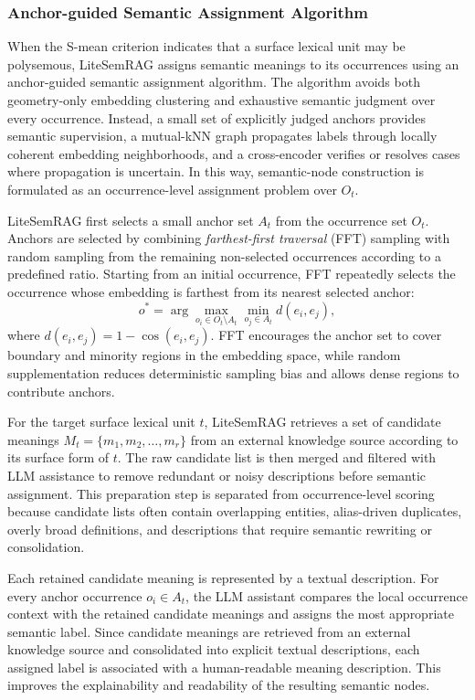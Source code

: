 \documentclass[conference]{IEEEtran}
\begin{document}
\subsubsection{Anchor-guided Semantic Assignment Algorithm}
When the S-mean criterion indicates that a surface lexical unit may be polysemous, LiteSemRAG assigns semantic meanings to its occurrences using an anchor-guided semantic assignment algorithm. The algorithm avoids both geometry-only embedding clustering and exhaustive semantic judgment over every occurrence. Instead, a small set of explicitly judged anchors provides semantic supervision, a mutual-kNN graph propagates labels through locally coherent embedding neighborhoods, and a cross-encoder verifies or resolves cases where propagation is uncertain. In this way, semantic-node construction is formulated as an occurrence-level assignment problem over $O_t$.

LiteSemRAG first selects a small anchor set $A_t$ from the occurrence set $O_t$. Anchors are selected by combining \emph{farthest-first traversal} (FFT) sampling with random sampling from the remaining non-selected occurrences according to a predefined ratio. Starting from an initial occurrence, FFT repeatedly selects the occurrence whose embedding is farthest from its nearest selected anchor:
\[
o^* = \arg\max_{o_i \in O_t \setminus A_t} \min_{o_j \in A_t} d(e_i,e_j),
\]
where
$
d(e_i,e_j)=1-\cos(e_i,e_j).
$
FFT encourages the anchor set to cover boundary and minority regions in the embedding space, while random supplementation reduces deterministic sampling bias and allows dense regions to contribute anchors.

For the target surface lexical unit $t$, LiteSemRAG retrieves a set of candidate meanings
$
M_t = \{m_1,m_2,\dots,m_r\}
$
from an external knowledge source according to its surface form of $t$. The raw candidate list is then merged and filtered with LLM assistance to remove redundant or noisy descriptions before semantic assignment. This preparation step is separated from occurrence-level scoring because candidate lists often contain overlapping entities, alias-driven duplicates, overly broad definitions, and descriptions that require semantic rewriting or consolidation.

Each retained candidate meaning is represented by a textual description. For every anchor occurrence $o_i \in A_t$, the LLM assistant compares the local occurrence context with the retained candidate meanings and assigns the most appropriate semantic label. Since candidate meanings are retrieved from an external knowledge source and consolidated into explicit textual descriptions, each assigned label is associated with a human-readable meaning description. This improves the explainability and readability of the resulting semantic nodes.
\end{document}
